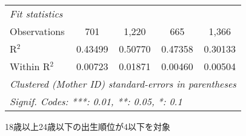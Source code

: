 \documentclass{article}
\begin{document}
\begin{landscape}
\begin{threeparttable}[b]
\begin{tabular}{lcccc}
      \emph{Fit statistics}\\
      Observations                                  & 701     & 1,220   & 665     & 1,366\\  
      R$^2$                                         & 0.43499 & 0.50770 & 0.47358 & 0.30133\\  
      Within R$^2$                                  & 0.00723 & 0.01871 & 0.00460 & 0.00504\\  
      \midrule \midrule
      \multicolumn{5}{l}{\emph{Clustered (Mother ID) standard-errors in parentheses}}\\
      \multicolumn{5}{l}{\emph{Signif. Codes: ***: 0.01, **: 0.05, *: 0.1}}\\
   \end{tabular}
   
   \begin{tablenotes}\item 18歳以上24歳以下の出生順位が4以下を対象
   \end{tablenotes}
\end{threeparttable}
\par\endgroup


\end{landscape}
\end{document}
